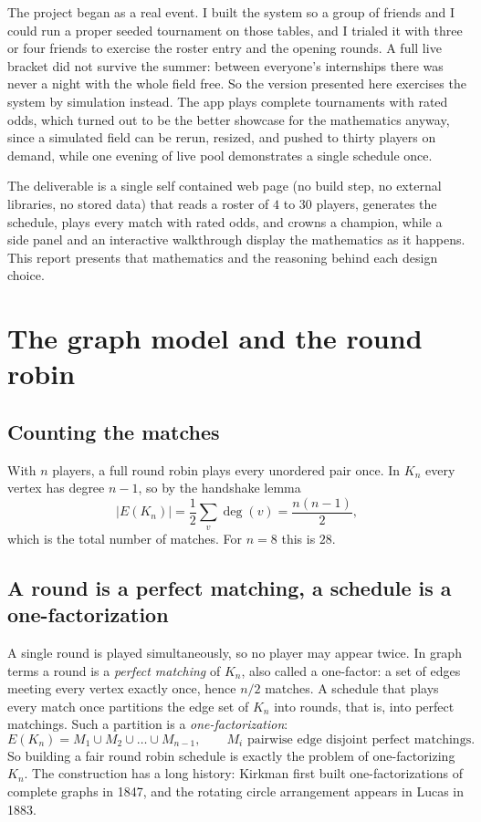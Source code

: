 \documentclass[11pt]{article}
\begin{document}
The project began as a real event. I built the system so a group of friends and I
could run a proper seeded tournament on those tables, and I trialed it with three
or four friends to exercise the roster entry and the opening rounds. A full live
bracket did not survive the summer: between everyone's internships there was never
a night with the whole field free. So the version presented here exercises the
system by simulation instead. The app plays complete tournaments with rated odds,
which turned out to be the better showcase for the mathematics anyway, since a
simulated field can be rerun, resized, and pushed to thirty players on demand,
while one evening of live pool demonstrates a single schedule once.

The deliverable is a single self contained web page (no build step, no external
libraries, no stored data) that reads a roster of $4$ to $30$ players, generates
the schedule, plays every match with rated odds, and crowns a champion, while a
side panel and an interactive walkthrough display the mathematics as it happens.
This report presents that mathematics and the reasoning behind each design choice.

\section{The graph model and the round robin}

\subsection{Counting the matches}

With $n$ players, a full round robin plays every unordered pair once. In $K_n$
every vertex has degree $n-1$, so by the handshake lemma
\[
|E(K_n)| = \frac{1}{2}\sum_{v}\deg(v) = \frac{n(n-1)}{2},
\]
which is the total number of matches. For $n=8$ this is $28$.

\subsection{A round is a perfect matching, a schedule is a one-factorization}

A single round is played simultaneously, so no player may appear twice. In graph
terms a round is a \emph{perfect matching} of $K_n$, also called a one-factor: a
set of edges meeting every vertex exactly once, hence $n/2$ matches. A schedule
that plays every match once partitions the edge set of $K_n$ into rounds, that is,
into perfect matchings. Such a partition is a \emph{one-factorization}:
\[
E(K_n) = M_1 \cup M_2 \cup \dots \cup M_{n-1}, \qquad M_i \text{ pairwise edge disjoint perfect matchings.}
\]
So building a fair round robin schedule is exactly the problem of one-factorizing
$K_n$. The construction has a long history: Kirkman first built one-factorizations
of complete graphs in 1847, and the rotating circle arrangement appears in Lucas
in 1883.
\end{document}
